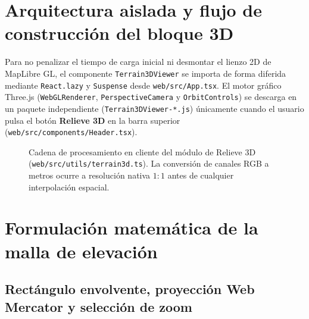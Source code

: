 \documentclass[11pt,a4paper]{article}
\newcommand{\src}[1]{\nolinkurl{#1}}
\begin{document}
\section{Arquitectura aislada y flujo de construcción del bloque 3D}
\label{sec:relieve3d-arquitectura}

Para no penalizar el tiempo de carga inicial ni desmontar el lienzo 2D de MapLibre GL, el componente
\texttt{Terrain3DViewer} se importa de forma diferida mediante \texttt{React.lazy} y \texttt{Suspense} desde
\src{web/src/App.tsx}. El motor gráfico Three.js (\texttt{WebGLRenderer}, \texttt{PerspectiveCamera} y
\texttt{OrbitControls}) se descarga en un paquete independiente (\texttt{Terrain3DViewer-*.js}) únicamente
cuando el usuario pulsa el botón \textbf{Relieve 3D} en la barra superior (\src{web/src/components/Header.tsx}).

\begin{figure}[htbp]
\centering
{}
\caption{Cadena de procesamiento en cliente del módulo de Relieve 3D (\src{web/src/utils/terrain3d.ts}).
La conversión de canales RGB a metros ocurre a resolución nativa $1:1$ antes de cualquier interpolación
espacial.}
\label{fig:flujo-relieve3d}
\end{figure}

\section{Formulación matemática de la malla de elevación}
\label{sec:relieve3d-matematicas}

\subsection{Rectángulo envolvente, proyección Web Mercator y selección de zoom}
\label{sec:relieve3d-mercator}
\end{document}
